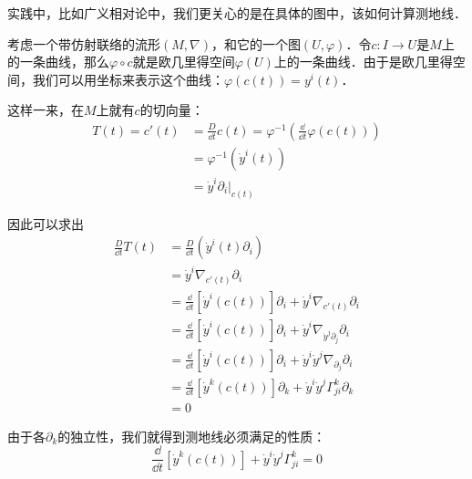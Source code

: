 实践中，比如广义相对论中，我们更关心的是在具体的图中，该如何计算测地线．

考虑一个带仿射联络的流形$(M, \nabla)$，和它的一个图$(U, \varphi)$．令$c:I\to U$是$M$上的一条曲线，那么$\varphi\circ c$就是欧几里得空间$\varphi(U)$上的一条曲线．由于是欧几里得空间，我们可以用坐标来表示这个曲线：$\varphi(c(t))=y^i(t)$．


这样一来，在$M$上就有$c$的切向量：
\begin{equation}
\begin{aligned}
T(t)=c'(t)&=\frac{D}{\dd t}c(t)=\varphi^{-1}(\frac{\dd}{\dd t}\varphi(c(t)))\\
&=\varphi^{-1}(\dot{y}^i(t))\\
&=\dot{y}^i\partial_i|_{c(t)}
\end{aligned}
\end{equation}

因此可以求出
\begin{equation}
\begin{aligned}
\frac{D}{\dd t}T(t)&=\frac{D}{\dd t}(\dot{y}^i(t)\partial_i)\\
&=\dot{y}^i\nabla_{c'(t)}\partial_i\\
&=\frac{\dd}{\dd t}[\dot{y}^i(c(t))]\partial_i+\dot{y}^i\nabla_{c'(t)}\partial_i\\
&=\frac{\dd}{\dd t}[\dot{y}^i(c(t))]\partial_i+\dot{y}^i\nabla_{\dot{y}^j\partial_j}\partial_i\\
&=\frac{\dd}{\dd t}[\dot{y}^i(c(t))]\partial_i+\dot{y}^i\dot{y}^j\nabla_{\partial_j}\partial_i\\
&=\frac{\dd}{\dd t}[\dot{y}^k(c(t))]\partial_k+\dot{y}^i\dot{y}^j\Gamma^k_{ji}\partial_k\\
&=0
\end{aligned}
\end{equation}

由于各$\partial_k$的独立性，我们就得到测地线必须满足的性质：
\begin{equation}
\frac{\dd}{\dd t}[\dot{y}^k(c(t))]+\dot{y}^i\dot{y}^j\Gamma^k_{ji}=0
\end{equation}





















